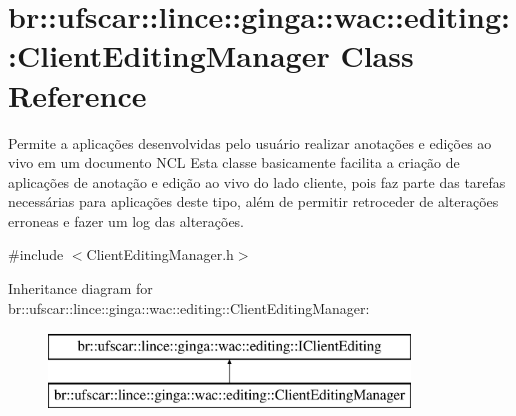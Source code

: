 \hypertarget{classbr_1_1ufscar_1_1lince_1_1ginga_1_1wac_1_1editing_1_1ClientEditingManager}{
\section{br::ufscar::lince::ginga::wac::editing::ClientEditingManager Class Reference}
\label{classbr_1_1ufscar_1_1lince_1_1ginga_1_1wac_1_1editing_1_1ClientEditingManager}
}


Permite a aplicações desenvolvidas pelo usuário realizar anotações e edições ao vivo em um documento NCL Esta classe basicamente facilita a criação de aplicações de anotação e edição ao vivo do lado cliente, pois faz parte das tarefas necessárias para aplicações deste tipo, além de permitir retroceder de alterações erroneas e fazer um log das alterações.  




{\ttfamily \#include $<$ClientEditingManager.h$>$}

Inheritance diagram for br::ufscar::lince::ginga::wac::editing::ClientEditingManager:\begin{figure}[H]
\begin{center}
\leavevmode
\includegraphics[height=2cm]{classbr_1_1ufscar_1_1lince_1_1ginga_1_1wac_1_1editing_1_1ClientEditingManager}
\end{center}
\end{figure}
